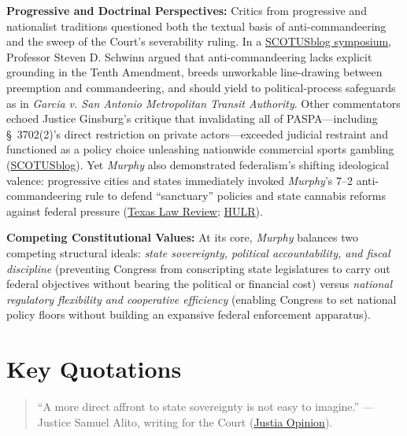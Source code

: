 \documentclass[12pt]{article}
\begin{document}
\textbf{Progressive and Doctrinal Perspectives:} Critics from progressive and nationalist traditions questioned both the textual basis of anti-commandeering and the sweep of the Court's severability ruling. In a \href{https://www.scotusblog.com/2017/08/symposium-time-abandon-anti-commandeering-dont-count-supreme-court/}{SCOTUSblog symposium}, Professor Steven D. Schwinn argued that anti-commandeering lacks explicit grounding in the Tenth Amendment, breeds unworkable line-drawing between preemption and commandeering, and should yield to political-process safeguards as in \textit{Garcia v. San Antonio Metropolitan Transit Authority}. Other commentators echoed Justice Ginsburg's critique that invalidating all of PASPA---including \S~3702(2)'s direct restriction on private actors---exceeded judicial restraint and functioned as a policy choice unleashing nationwide commercial sports gambling (\href{https://www.scotusblog.com/2018/05/opinion-analysis-justices-strike-down-federal-sports-gambling-law/}{SCOTUSblog}). Yet \textit{Murphy} also demonstrated federalism's shifting ideological valence: progressive cities and states immediately invoked \textit{Murphy}'s 7--2 anti-commandeering rule to defend ``sanctuary'' policies and state cannabis reforms against federal pressure (\href{https://texaslawreview.org/making-federalism-great-again/}{Texas Law Review}; \href{https://hulr.org/spring-2022/murphy-v-ncaa}{HULR}).

\textbf{Competing Constitutional Values:} At its core, \textit{Murphy} balances two competing structural ideals: \textit{state sovereignty, political accountability, and fiscal discipline} (preventing Congress from conscripting state legislatures to carry out federal objectives without bearing the political or financial cost) versus \textit{national regulatory flexibility and cooperative efficiency} (enabling Congress to set national policy floors without building an expansive federal enforcement apparatus).

\section{Key Quotations}

\begin{quote}
``A more direct affront to state sovereignty is not easy to imagine.''
--- Justice Samuel Alito, writing for the Court (\href{https://supreme.justia.com/cases/federal/us/584/16-476/}{Justia Opinion}).
\end{quote}
\end{document}
